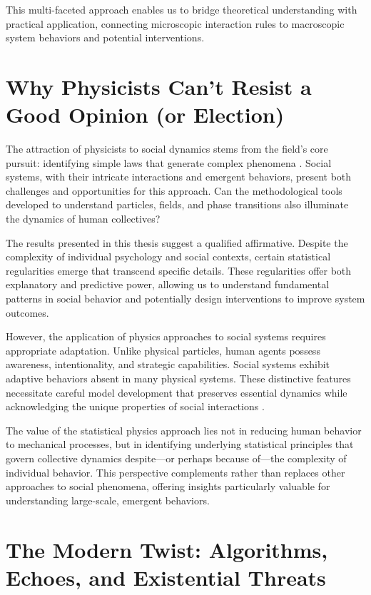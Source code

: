 This multi-faceted approach enables us to bridge theoretical understanding with practical application, connecting microscopic interaction rules to macroscopic system behaviors and potential interventions.

\section{Why Physicists Can't Resist a Good Opinion (or Election)}

The attraction of physicists to social dynamics stems from the field's core pursuit: identifying simple laws that generate complex phenomena \cite{galam2012sociophysics}. Social systems, with their intricate interactions and emergent behaviors, present both challenges and opportunities for this approach. Can the methodological tools developed to understand particles, fields, and phase transitions also illuminate the dynamics of human collectives?

The results presented in this thesis suggest a qualified affirmative. Despite the complexity of individual psychology and social contexts, certain statistical regularities emerge that transcend specific details. These regularities offer both explanatory and predictive power, allowing us to understand fundamental patterns in social behavior and potentially design interventions to improve system outcomes.

However, the application of physics approaches to social systems requires appropriate adaptation. Unlike physical particles, human agents possess awareness, intentionality, and strategic capabilities. Social systems exhibit adaptive behaviors absent in many physical systems. These distinctive features necessitate careful model development that preserves essential dynamics while acknowledging the unique properties of social interactions \cite{competing-opinions-and-stubborness-connecting-models-to-data}.

The value of the statistical physics approach lies not in reducing human behavior to mechanical processes, but in identifying underlying statistical principles that govern collective dynamics despite—or perhaps because of—the complexity of individual behavior. This perspective complements rather than replaces other approaches to social phenomena, offering insights particularly valuable for understanding large-scale, emergent behaviors.

\section{The Modern Twist: Algorithms, Echoes, and Existential Threats}

